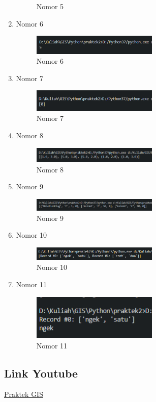 \begin{enumerate}
\begin{figure}[H]
		\centering
		\caption{Nomor 5}
    \end{figure}
    \item Nomor 6
    
    \begin{figure}[H]
		\includegraphics[width=6cm]{figures/1174035/tugas3/soal6_result.png}
		\centering
		\caption{Nomor 6}
    \end{figure}
    \item Nomor 7
    
    \begin{figure}[H]
		\includegraphics[width=6cm]{figures/1174035/tugas3/soal7_result.png}
		\centering
		\caption{Nomor 7}
    \end{figure}
    \item Nomor 8
    
    \begin{figure}[H]
		\includegraphics[width=6cm]{figures/1174035/tugas3/soal8_result.png}
		\centering
		\caption{Nomor 8}
    \end{figure}
    \item Nomor 9
    
    \begin{figure}[H]
		\includegraphics[width=6cm]{figures/1174035/tugas3/soal9_result.png}
		\centering
		\caption{Nomor 9}
    \end{figure}
    \item Nomor 10
    
    \begin{figure}[H]
		\includegraphics[width=6cm]{figures/1174035/tugas3/soal10_result.png}
		\centering
		\caption{Nomor 10}
    \end{figure}
    \item Nomor 11
    
    \begin{figure}[H]
		\includegraphics[width=6cm]{figures/1174035/tugas3/soal11_result.png}
		\centering
		\caption{Nomor 11}
	\end{figure}
\end{enumerate}
\subsection{Link Youtube}
\href{https://youtu.be/8i37HQsiDBg}{Praktek GIS}